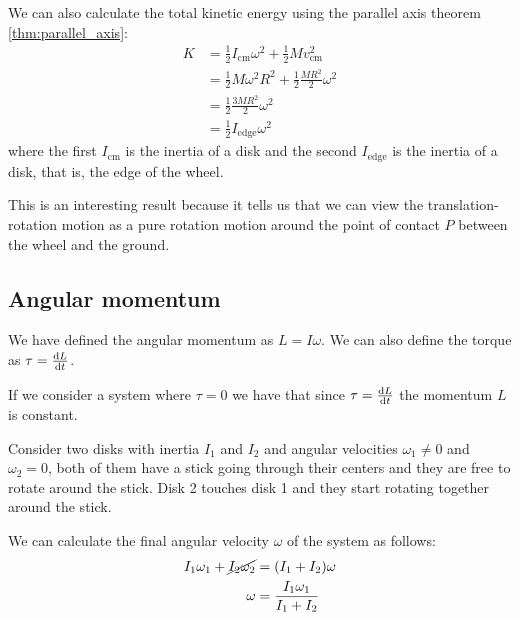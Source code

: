 \documentclass[12pt]{extarticle}
\begin{document}
We can also calculate the total kinetic energy using the parallel axis theorem \ref{thm:parallel_axis}:
\begin{align}
    K & = \frac{1}{2} I_{\text{cm}} \omega^2 + \frac{1}{2} M v_{\text{cm}}^2 \\
      & = \frac{1}{2} M \omega^2 R^2 + \frac{1}{2} \frac{M R^2}{2} \omega^2  \\
      & = \frac{1}{2} \frac{3M R^2}{2} \omega^2                              \\
      & = \frac{1}{2} I_{\text{edge}} \omega^2
\end{align}
where the first $I_{\text{cm}}$ is the inertia of a disk and the second $I_{\text{edge}}$ is the inertia of a disk, that is, the edge of the wheel.

This is an interesting result because it tells us that we can view the translation-rotation motion as a pure rotation motion around the point of contact $P$ between the wheel and the ground.

\subsection{Angular momentum}

We have defined the angular momentum as $L = I \omega$. We can also define the torque as $\tau = \dv{L}{t}$.

If we consider a system where $\tau = 0$ we have that since $\tau = \dv{L}{t}$ the momentum $L$ is constant.

\begin{example}
    Consider two disks with inertia $I_1$ and $I_2$ and angular velocities $\omega_1 \ne 0$ and $\omega_2 = 0$, both of them have a stick going through their centers and they are free to rotate around the stick.
    Disk 2 touches disk 1 and they start rotating together around the stick.

    We can calculate the final angular velocity $\omega$ of the system as follows:
    \begin{align}
        I_1 \omega_1 + \cancel{I_2 \omega_2} & = (I_1 + I_2) \omega             \\
        \omega                               & = \frac{I_1 \omega_1}{I_1 + I_2}
    \end{align}
\end{example}
\end{document}
